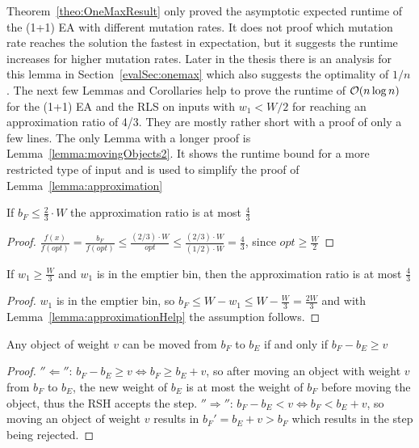Theorem~\ref{theo:OneMaxResult} only proved the asymptotic expected runtime of the (1+1) EA with different mutation rates.
It does not proof which mutation rate reaches the solution the fastest in expectation, but it suggests the runtime increases for higher mutation rates.
Later in the thesis there is an analysis for this lemma in Section~\ref{evalSec:onemax} which also suggests the optimality of $1/n$.\newline
The next few Lemmas and Corollaries help to prove the runtime of $\mathcal{O}(n\log{n})$ for the (1+1) EA and the RLS on inputs with $w_1<W/2$ for reaching an approximation ratio of 4/3.
They are mostly rather short with a proof of only a few lines.
The only Lemma with a longer proof is Lemma~\ref{lemma:movingObjects2}.
It shows the runtime bound for a more restricted type of input and is used to simplify the proof of Lemma~\ref{lemma:approximation}

\begin{lemma}\label{lemma:approximationHelp}
    If \(b_F \le \frac{2}{3} \cdot W\) the approximation ratio is at most $\frac{4}{3}$
\end{lemma}
\begin{proof}
    \(\frac{f(x)}{f(opt)}=\frac{b_F}{f(opt)} \le \frac{(2/3) \cdot W}{opt} \le \frac{(2/3) \cdot W}{(1/2) \cdot W} = \frac{4}{3}\), since \(opt \ge \frac{W}{2}\)
\end{proof}

\begin{corollary}\label{cor:approximationHelp}
    If \(w_1 \ge \frac{W}{3}\) and \(w_1\) is in the emptier bin, then the approximation ratio is at most $\frac{4}{3}$
\end{corollary}
\begin{proof}
    $w_1$ is in the emptier bin, so \( b_F \le W - w_1 \le W - \frac{W}{3} = \frac{2W}{3} \) and with Lemma~\ref{lemma:approximationHelp} the assumption follows.
\end{proof}

\begin{lemma}\label{lemma:movingObjects}
    Any object of weight $v$ can be moved from $b_F$ to $b_E$ if and only if \(b_F - b_E \ge v\)
\end{lemma}
\begin{proof}
    $''\Leftarrow''$:\newline
    \(b_F - b_E \ge v \Leftrightarrow b_F \ge b_E + v\), so after moving an object with weight $v$ from $b_F$ to $b_E$, the new weight of $b_E$ is at most the weight of $b_F$ before moving the object, thus the RSH accepts the step.\newline
    $''\Rightarrow''$:\newline
    \(b_F - b_E < v \Leftrightarrow b_F < b_E + v\), so moving an object of weight $v$ results in ${b_F}' = b_E+v > b_F$ which results in the step being rejected.
\end{proof}


